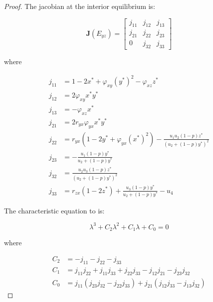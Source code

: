 \begin{proof}
    The jacobian at the interior equilibrium is:

    \begin{equation}\label{matrix:jacobian-interior}
        \textbf{J}\left(E_{yz}\right) = \begin{bmatrix}
            j_{11} & j_{12} & j_{13}\\
            j_{21} & j_{22} & j_{23}\\
            0 & j_{32} & j_{33}
        \end{bmatrix}
    \end{equation}

    where
    
    \begin{align*}
        j_{11} &= 1-2x^*+\varphi_{xy}\left(y^*\right)^2-\varphi_{xz}z^*\\
        j_{12} &= 2\varphi_{xy}x^*y^*\\
        j_{13} &= -\varphi_{xz}x^*\\
        j_{21} &= 2r_{yx}\varphi_{yx}x^*y^*\\
        j_{22} &= r_{yx}\left(1-2y^*+\varphi_{yx}\left(x^*\right)^2\right)-\frac{u_1u_2\left(1-p\right)z^*}{\left(u_2+\left(1-p\right)y^*\right)^2}\\
        j_{23} &= -\frac{u_1\left(1-p\right)y^*}{u_2+\left(1-p\right)y^*}\\
        j_{32} &= \frac{u_2u_3\left(1-p\right)z^*}{\left(u_2+\left(1-p\right)y^*\right)^2}\\
        j_{33} &= r_{zx}\left(1-2z^*\right)+\frac{u_3\left(1-p\right)y^*}{u_2+\left(1-p\right)y^*}-u_4
    \end{align*}

    The characteristic equation to  is:

    \begin{equation*}\label{eq:char-eq-interior}
        \lambda^3+C_2\lambda^2+C_1\lambda+C_0=0
    \end{equation*}

    where
    
    \begin{align*}
        C_2 &= -j_{11}-j_{22}-j_{33}\\
        C_1 &= j_{11}j_{22}+j_{11}j_{33}+j_{22}j_{33}-j_{12}j_{21}-j_{23}j_{32}\\
        C_0 &= j_{11}\left(j_{23}j_{32}-j_{22}j_{33}\right)+j_{21}\left(j_{12}j_{33}-j_{13}j_{32}\right)
    \end{align*}


\end{proof}
